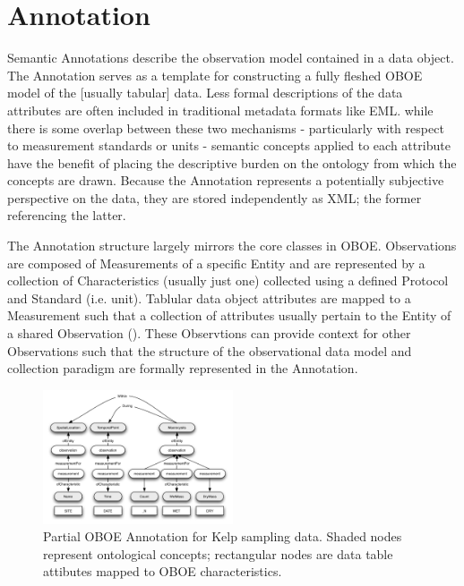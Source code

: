 
\section{Annotation}
\label{sec:annotation}

Semantic Annotations describe the observation model contained in a data object. The Annotation serves as a template for constructing a fully fleshed OBOE model of the [usually tabular] data. Less formal descriptions of the data attributes are often included in traditional metadata formats like EML. while there is some overlap between these two mechanisms - particularly with respect to measurement standards or units - semantic concepts applied to each attribute have the benefit of placing the descriptive burden on the ontology from which the concepts are drawn. Because the Annotation represents a potentially subjective perspective on the data, they are stored independently as XML; the former referencing the latter.

The Annotation structure largely mirrors the core classes in OBOE. Observations are composed of Measurements of a specific Entity and are represented by a collection of Characteristics (usually just one) collected using a defined Protocol and Standard (i.e. unit). 
Tablular data object attributes are mapped to a Measurement such that a collection of attributes usually pertain to the Entity of a shared Observation (). These Observtions can provide context for other Observations such that the structure of the observational data model and collection paradigm are formally represented in the Annotation.

\begin{figure}
\centering
\includegraphics[width=0.5\textwidth]{images/kelp-mass-model.png}
\caption{Partial OBOE Annotation for Kelp sampling data. Shaded nodes represent ontological concepts; rectangular nodes are data table attibutes mapped to OBOE characteristics.}
\label{fig:kelp-mass-model}
\end{figure}


